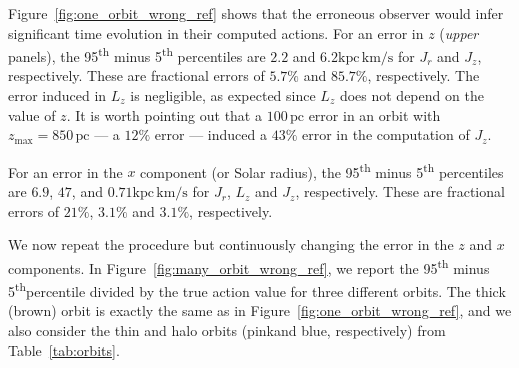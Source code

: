 \documentclass[twocolumn]{aastex62}
\newcommand{\pc}{\text{pc}}
\newcommand{\Gyr}{\text{Gyr}}
\newcommand{\kms}{\text{km}/\text{s}}
\newcommand{\actunit}{\text{kpc}\,\kms}
\newcommand{\uth}{\textsuperscript{th}}
\newcommand{\thincolor}{pink}
\newcommand{\thickcolor}{brown}
\newcommand{\halocolor}{blue}
\begin{document}
Figure~\ref{fig:one_orbit_wrong_ref} shows that the erroneous observer would
infer significant time evolution in their computed actions. For an error in
$z$ ({\em upper} panels), the 95\textsuperscript{th} minus
5\textsuperscript{th} percentiles are $2.2$ and $6.2 \actunit$ for $J_r$ and
$J_z$, respectively. These are fractional errors of $5.7\%$ and $85.7\%$,
respectively. The error induced in $L_z$ is negligible, as expected since
$L_z$ does not depend on the value of $z$. It is worth pointing out that a
$100\,\pc$ error in an orbit with $z_{\text{max}}=850\,\pc$ --- a $12\%$ error
--- induced a $43\%$ error in the computation of $J_z$.

For an error in the $x$ component (or Solar radius), the
95\textsuperscript{th} minus 5\textsuperscript{th} percentiles are $6.9$, $47$,
and $0.71 \actunit$ for $J_r$, $L_z$ and $J_z$, respectively. These are
fractional errors of $21\%$, $3.1\%$ and $3.1\%$, respectively.

\begin{figure*}
\caption{The artificial phase-dependence in the observed actions induced by an
error in the Galactocentric coordinate system. We consider here the thick disk
orbit, which has actions of $(J_r, L_z, J_z) = (37.9, -1520, 7.0)\,\actunit$
and $z_{\text{max}}=850\,\pc$ (see Table~\ref{tab:orbits}). We integrate the
orbit according to the procedure laid out in Section~\ref{ssec:action_comp}.
Then, we subtract $100\,\pc$ from the $z$ value ({\em upper panels}) or the
$x$ value ({\em lower panels}) of each position in the orbit, corresponding to
an erroneous observer assuming a midplane ({\em upper}) or solar radius ({\em
lower}) that is off by $100\,\pc$. We then allow our (immortal) observer to
observe the orbit over $1\,\Gyr$ and perform the same orbit integration
procedure at each timestep, and report the values of the actions. The
computation of $L_z$ is pristine to errors in $z$, with only numerical
artifacts remaining. Only small errors are induced in $J_r$, with the middle
$90\%$ of values over the $\Gyr$ being $\sim8\%$ of the true $J_r$. As
expected, large errors are induced in $J_z$ with a $100\,\pc$ offset in $z$,
with the middle $90\%$ of values being $\sim43\%$ of the true $J_z$. The $x$
offset induces uncertainties in $J_r$ and $L_z$ of $\sim21\%$ and $\sim3\%$,
respectively. A $\sim3\%$ error in $J_z$ is also induced.}
\label{fig:one_orbit_wrong_ref}
\end{figure*}

We now repeat the procedure but continuously changing the error in the $z$ and
$x$ components. In Figure~\ref{fig:many_orbit_wrong_ref}, we report the 95\uth
minus 5\uth percentile divided by the true action value for three different
orbits. The thick (\thickcolor) orbit is exactly the same as in
Figure~\ref{fig:one_orbit_wrong_ref}, and we also consider the thin and halo
orbits (\thincolor and \halocolor, respectively) from Table~\ref{tab:orbits}.
\end{document}
